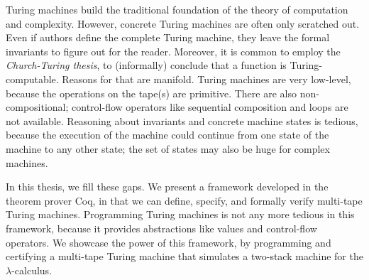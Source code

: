 Turing machines build the traditional foundation of the theory of computation and complexity.  However, concrete Turing machines are often only
scratched out.  Even if authors define the complete Turing machine, they leave the formal invariants to figure out for the reader.  Moreover, it is
common to employ the \textit{Church-Turing thesis}, to (informally) conclude that a function is Turing-computable.  Reasons for that are manifold.
Turing machines are very low-level, because the operations on the tape(s) are primitive.  There are also non-compositional; control-flow operators
like sequential composition and loops are not available.  Reasoning about invariants and concrete machine states is tedious, because the execution of
the machine could continue from one state of the machine to any other state; the set of states may also be huge for complex machines.

In this thesis, we fill these gaps.  We present a framework developed in the theorem prover Coq, in that we can define, specify, and formally verify
multi-tape Turing machines.  Programming Turing machines is not any more tedious in this framework, because it provides abstractions like values and
control-flow operators.  We showcase the power of this framework, by programming and certifying a multi-tape Turing machine that simulates a two-stack
machine for the $\lambda$-calculus.


